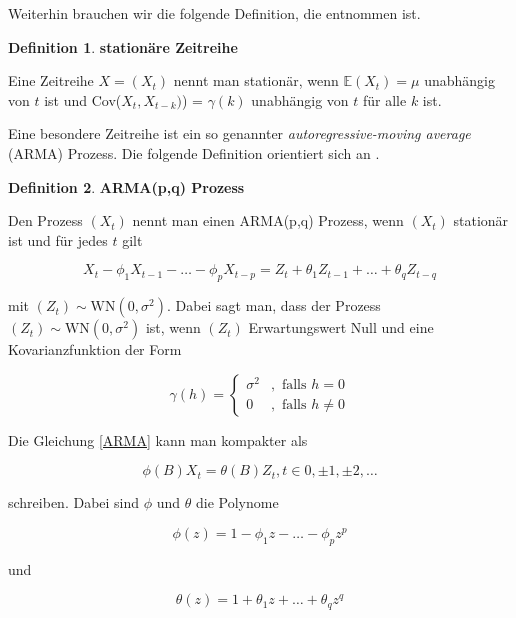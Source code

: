 \documentclass[12pt,a4paper]{article}
\theoremstyle{definition}
\newtheorem{Definition}{Definition}[subsection]
\theoremstyle{definition}
\theoremstyle{definition}
\theoremstyle{definition}
\begin{document}
Weiterhin brauchen wir die folgende Definition, die \cite{Hansen15} entnommen ist.

\begin{Definition}
\textbf{stationäre Zeitreihe}

Eine Zeitreihe $X = (X_t)$ nennt man stationär, wenn $\mathbb{E}(X_t) = \mu$ unabhängig von $t$ ist und Cov($X_t,X_{t-k})$) = $\gamma (k)$ unabhängig von $t$ für alle $k$ ist.
\end{Definition}

Eine besondere Zeitreihe ist ein so genannter \textit{autoregressive-moving average} (ARMA) Prozess. Die folgende Definition orientiert sich an \cite[78]{Brockwell91}.

\begin{Definition}
\textbf{ARMA(p,q) Prozess}

Den Prozess $(X_t)$ nennt man einen ARMA(p,q) Prozess, wenn $(X_t)$ stationär ist und für jedes $t$ gilt

\begin{equation}\label{ARMA}
X_t - \phi_1 X_{t-1} - \ldots - \phi_p X_{t-p} = Z_t + \theta_1 Z_{t-1} + \ldots + \theta_q Z_{t-q}
\end{equation}

mit $(Z_t) \sim \text{WN}(0, \sigma^2)$.  Dabei sagt man, dass der Prozess $(Z_t) \sim \text{WN}(0, \sigma^2)$ ist, wenn $(Z_t)$ Erwartungswert Null und eine Kovarianzfunktion der Form

\begin{equation*}
\gamma(h) = \begin{cases} \sigma^2 &, \text{ falls } h=0 \\ 0 &, \text{ falls } h \neq 0 \end{cases}
\end{equation*}
\end{Definition}

Die Gleichung \eqref{ARMA} kann man kompakter als

\begin{equation*}
\phi(B) X_t = \theta(B) Z_t, t \in 0, \pm 1, \pm 2, \ldots
\end{equation*}

schreiben. Dabei sind $\phi$ und $\theta$ die Polynome

\begin{equation*}
\phi(z) = 1 - \phi_1 z - \ldots - \phi_p z^p
\end{equation*}

und 

\begin{equation*}
\theta(z) = 1 + \theta_1 z + \ldots + \theta_q z^q
\end{equation*}
\end{document}
